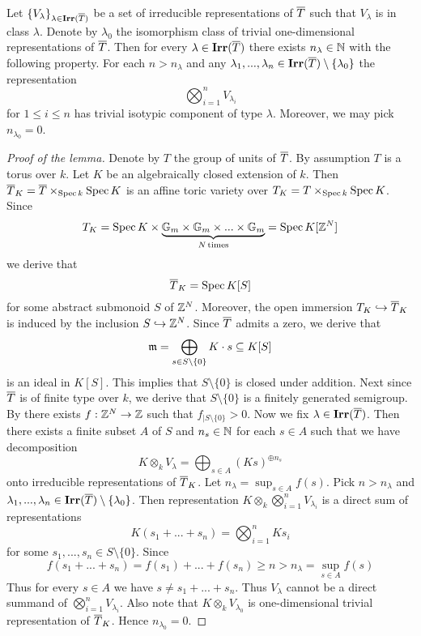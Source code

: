 \begin{lemma}\label{lemma:stablization_in_general}
Let $\{V_{\lambda}\}_{\lambda \in \mathbf{Irr}(\overline{T})}$ be a set of irreducible representations of $\overline{T}$ such that $V_{\lambda}$ is in class $\lambda$. Denote by $\lambda_0$ the isomorphism class of trivial one-dimensional representations of $\overline{T}$. Then for every $\lambda \in \mathbf{Irr}(\overline{T})$ there exists $n_{\lambda}\in {\mathbb N}$ with the following property. For each $n > n_{\lambda}$ and any $\lambda_1,...,\lambda_n\in \mathbf{Irr}(\overline{T})\setminus \{\lambda_0\}$ the representation
$$\bigotimes_{i=1}^nV_{\lambda_i}$$ 
for $1\leq i\leq n$ has trivial isotypic component of type $\lambda$. Moreover, we may pick $n_{\lambda_0} = 0$.
\end{lemma}

\begin{proof}[Proof of the lemma]
Denote by $T$ the group of units of $\overline{T}$. By assumption $T$ is a torus over $k$. Let $K$ be an algebraically closed extension of $k$. Then $\overline{T}_K = \overline{T}\times_{\mathrm{Spec}\, k}\mathrm{Spec}\, K$ is an affine toric variety over $T_K = T\times_{\mathrm{Spec}\, k}\mathrm{Spec}\, K$. Since
$$T_K = \mathrm{Spec}\, K \times \underbrace{\mathbb{G}_{m}\times \mathbb{G}_{m}\times ...\times \mathbb{G}_{m}}_{N\,\mathrm{times}} = \mathrm{Spec}\, K[{\mathbb Z}^N]$$
we derive that
$$\overline{T}_K = \mathrm{Spec}\, K[S]$$
for some abstract submonoid $S$ of ${\mathbb Z}^N$. Moreover, the open immersion $T_K\hookrightarrow \overline{T}_K$ is induced by the inclusion $S\hookrightarrow {\mathbb Z}^N$. Since $\overline{T}$ admits a zero, we derive that
$$\mathfrak{m} = \bigoplus_{s \in S\setminus\{0\}}K\cdot s\subseteq K[S]$$
is an ideal in $K[S]$. This implies that $S\setminus \{0\}$ is closed under addition. Next since $\overline{T}$ is of finite type over $k$, we derive that $S\setminus \{0\}$ is a finitely generated semigroup. By  there exists $f:{\mathbb Z}^N\rightarrow {\mathbb Z}$ such that $f_{\mid S\setminus \{0\}}>0$. Now we fix $\lambda \in \mathbf{Irr}(\overline{T})$. Then there exists a finite subset $A$ of $S$ and $n_s\in {\mathbb N}$ for each $s\in A$ such that we have decomposition
$$K\otimes_kV_{\lambda} = \bigoplus_{s\in A}\left(Ks\right)^{\oplus n_s}$$
onto irreducible representations of $\overline{T}_K$. Let $n_{\lambda} = \sup_{s\in A}f(s)$. Pick $n> n_{\lambda}$ and $\lambda_1,...,\lambda_n \in \mathbf{Irr}(\overline{T})\setminus \{\lambda_0\}$. Then representation $K\otimes_k\bigotimes_{i=1}^nV_{\lambda_i}$ is a direct sum of representations
$$K(s_1+...+s_n) = \bigotimes_{i=1}^nKs_i$$
for some $s_1,...,s_n\in S\setminus \{0\}$. Since
$$f(s_1+...+s_n) = f(s_1) + ... + f(s_n) \geq n > n_{\lambda} = \sup_{s\in A}f(s)$$
Thus for every $s\in A$ we have $s \neq s_1+...+s_n$. Thus $V_{\lambda}$ cannot be a direct summand of $\bigotimes_{i=1}^nV_{\lambda_i}$. Also note that $K\otimes_kV_{\lambda_0}$ is one-dimensional trivial representation of $\overline{T}_K$. Hence $n_{\lambda_0}=0$.
\end{proof}

